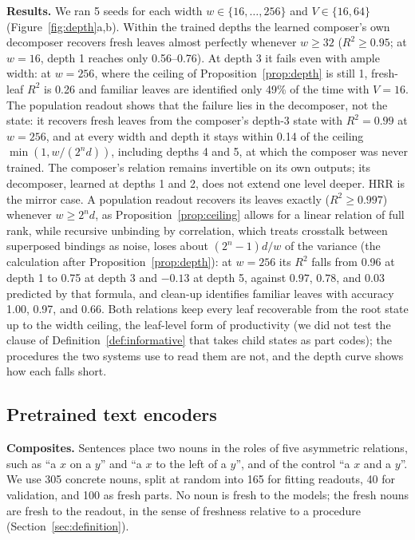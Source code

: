 \documentclass[10pt]{article}
\theoremstyle{plain}
\theoremstyle{remark}
\begin{document}
\textbf{Results.} We ran 5 seeds for each width $w \in \{16, \ldots, 256\}$ and $V \in \{16, 64\}$ (Figure~\ref{fig:depth}a,b). Within the trained depths the learned composer's own decomposer recovers fresh leaves almost perfectly whenever $w \ge 32$ ($R^2 \ge 0.95$; at $w = 16$, depth 1 reaches only 0.56--0.76). At depth 3 it fails even with ample width: at $w = 256$, where the ceiling of Proposition~\ref{prop:depth} is still 1, fresh-leaf $R^2$ is 0.26 and familiar leaves are identified only 49\% of the time with $V = 16$. The population readout shows that the failure lies in the decomposer, not the state: it recovers fresh leaves from the composer's depth-3 state with $R^2 = 0.99$ at $w = 256$, and at every width and depth it stays within 0.14 of the ceiling $\min(1, w/(2^n d))$, including depths 4 and 5, at which the composer was never trained. The composer's relation remains invertible on its own outputs; its decomposer, learned at depths 1 and 2, does not extend one level deeper. HRR is the mirror case. A population readout recovers its leaves exactly ($R^2 \ge 0.997$) whenever $w \ge 2^n d$, as Proposition~\ref{prop:ceiling} allows for a linear relation of full rank, while recursive unbinding by correlation, which treats crosstalk between superposed bindings as noise, loses about $(2^n - 1)d/w$ of the variance (the calculation after Proposition~\ref{prop:depth}): at $w = 256$ its $R^2$ falls from 0.96 at depth 1 to 0.75 at depth 3 and $-0.13$ at depth 5, against $0.97$, $0.78$, and $0.03$ predicted by that formula, and clean-up identifies familiar leaves with accuracy 1.00, 0.97, and 0.66. Both relations keep every leaf recoverable from the root state up to the width ceiling, the leaf-level form of productivity (we did not test the clause of Definition~\ref{def:informative} that takes child states as part codes); the procedures the two systems use to read them are not, and the depth curve shows how each falls short.

\subsection{Pretrained text encoders}
\label{sec:pretrained}

\textbf{Composites.} Sentences place two nouns in the roles of five asymmetric relations, such as ``a $x$ on a $y$'' and ``a $x$ to the left of a $y$'', and of the control ``a $x$ and a $y$''. We use 305 concrete nouns, split at random into 165 for fitting readouts, 40 for validation, and 100 as fresh parts. No noun is fresh to the models; the fresh nouns are fresh to the readout, in the sense of freshness relative to a procedure (Section~\ref{sec:definition}).
\end{document}
